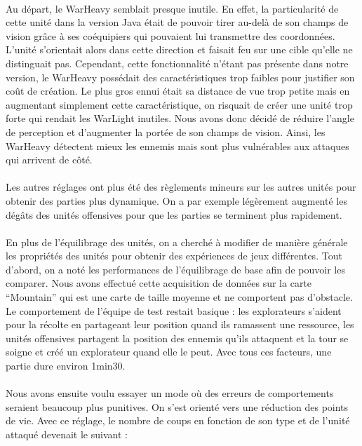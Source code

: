 \documentclass{report}
\begin{document}
\paragraph{}
Au départ, le WarHeavy semblait presque inutile. En effet, la particularité de cette unité dans la version Java était de pouvoir tirer au-delà de son champs de vision grâce à ses coéquipiers qui pouvaient lui transmettre des coordonnées. L’unité s’orientait alors dans cette direction et faisait feu sur une cible qu’elle ne distinguait pas. Cependant, cette fonctionnalité n’étant pas présente dans notre version, le WarHeavy possédait des caractéristiques trop faibles pour justifier son coût de création. Le plus gros ennui était sa distance de vue trop petite mais en augmentant simplement cette caractéristique, on risquait de créer une unité trop forte qui rendait les WarLight inutiles. \newline
Nous avons donc décidé de réduire l’angle de perception et d’augmenter la portée de son champs de vision. Ainsi, les WarHeavy détectent mieux les ennemis mais sont plus vulnérables aux attaques qui arrivent de côté.
\paragraph{}
Les autres réglages ont plus été des règlements mineurs sur les autres unités pour obtenir des parties plus dynamique. On a par exemple légèrement augmenté les dégâts des unités offensives pour que les parties se terminent plus rapidement.
\paragraph{}
En plus de l’équilibrage des unités, on a cherché à modifier de manière générale les propriétés des unités pour obtenir des expériences de jeux différentes. Tout d’abord, on a noté les performances de l’équilibrage de base afin de pouvoir les comparer. Nous avons effectué cette acquisition de données sur la carte “Mountain” qui est une carte de taille moyenne et ne comportent pas d’obstacle. Le comportement de l’équipe de test restait basique : les explorateurs s’aident pour la récolte en partageant leur position quand ils ramassent une ressource, les unités offensives partagent la position des ennemis qu’ils attaquent et la tour se soigne et créé un explorateur quand elle le peut. Avec tous ces facteurs, une partie dure environ 1min30.
\paragraph{}
Nous avons ensuite voulu essayer un mode où des erreurs de comportements seraient beaucoup plus punitives. On s’est orienté vers une réduction des points de vie. Avec ce réglage, le nombre de coups en fonction de son type et de l’unité attaqué devenait le suivant : 
\end{document}
